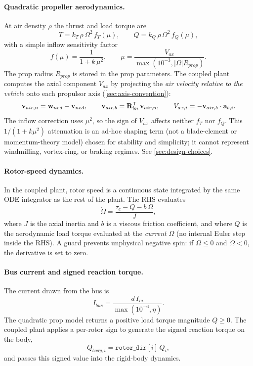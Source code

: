 \paragraph{Quadratic propeller aerodynamics.}
At air density $\rho$ the thrust and load torque are
\begin{equation}
  T = k_T\,\rho\,\Omega^2\,f_T(\mu),\qquad
  Q = k_Q\,\rho\,\Omega^2\,f_Q(\mu),
\end{equation}
with a simple inflow sensitivity factor
\begin{equation}
  f(\mu) = \frac{1}{1 + k\,\mu^2},\qquad \mu = \frac{V_{ax}}{\max(10^{-3}, |\Omega|R_{prop})}.
\end{equation}
The prop radius $R_{prop}$ is stored in the prop parameters. The coupled plant computes the axial component $V_{ax}$ by projecting the \emph{air velocity relative to the vehicle} onto each propulsor axis (\cref{sec:axis-convention}):
\begin{equation}
  \mathbf{v}_{air,n} = \mathbf{w}_{ned} - \mathbf{v}_{ned},\qquad
  \mathbf{v}_{air,b} = \mathbf{R}_{bn}^{\mathsf{T}}\,\mathbf{v}_{air,n},\qquad
  V_{ax,i} = -\mathbf{v}_{air,b}\cdot \mathbf{a}_{b,i}.
\end{equation}
The inflow correction uses $\mu^2$, so the sign of $V_{ax}$ affects neither $f_T$ nor $f_Q$. This $1/(1+k\mu^2)$ attenuation is an ad-hoc shaping term (not a blade-element or momentum-theory model) chosen for stability and simplicity; it cannot represent windmilling, vortex-ring, or braking regimes. See \cref{sec:design-choices}.

\paragraph{Rotor-speed dynamics.}
In the coupled plant, rotor speed is a continuous state integrated by the same ODE integrator as the rest of the plant. The RHS evaluates
\begin{equation}
  \dot{\Omega} = \frac{\tau_e - Q - b\,\Omega}{J},
\end{equation}
where $J$ is the axial inertia and $b$ is a viscous friction coefficient, and where $Q$ is the aerodynamic load torque evaluated at the \emph{current} $\Omega$ (no internal Euler step inside the RHS). A guard prevents unphysical negative spin: if $\Omega\le 0$ and $\dot{\Omega}<0$, the derivative is set to zero.

\paragraph{Bus current and signed reaction torque.}
The current drawn from the bus is
\begin{equation}
  I_{bus} = \frac{d\,I_m}{\max(10^{-6},\eta)}.
\end{equation}
The quadratic prop model returns a positive load torque magnitude $Q\ge 0$. The coupled plant applies a per-rotor sign  to generate the signed reaction torque on the body,
\begin{equation}
  Q_{body,i} = \texttt{rotor\_dir}[i]\,Q_i,
\end{equation}
and passes this signed value into the rigid-body dynamics.

